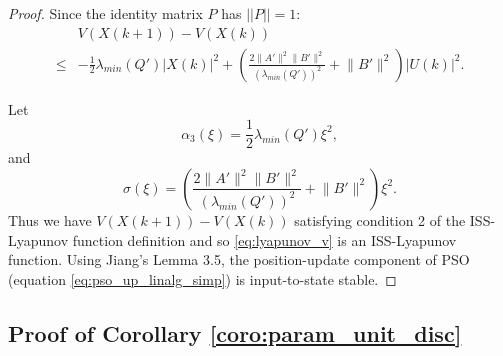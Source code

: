 \documentclass{sig-alternate}
\begin{document}
\begin{proof}
Since the identity matrix $ P $ has $ || P || = 1 $:
\begin{equation}
\label{eq:lyapunov_delta5}
\begin{aligned}
& V( X(k+1) ) - V( X(k) ) \\
	\leq & - \frac{1}{2} \lambda_{min}(Q') | X(k) |^{2} + \left( \frac{2 \lVert A' \rVert^{2} \lVert B' \rVert^{2}}{ ( \lambda_{min}(Q') )^{2} } + \lVert B' \rVert^{2} \right) | U(k) |^{2}.
\end{aligned}
\end{equation}
		
Let
\begin{equation}
\nonumber
\alpha_{3} ( \xi )= \frac{1}{2} \lambda_{min}(Q') \xi^{2} ,
\end{equation}
and
\begin{equation}
\nonumber
\sigma ( \xi ) = \left( \frac{2 \lVert A' \rVert^{2} \lVert B' \rVert^{2}}{ ( \lambda_{min}(Q') )^{2} } +  \lVert B' \rVert^{2} \right) \xi^{2} .
\end{equation} 
Thus we have $  V( X(k+1) ) - V( X(k) ) $ satisfying condition 2 of the ISS-Lyapunov function definition and
so \eqref{eq:lyapunov_v} is an ISS-Lyapunov function.
Using Jiang's Lemma 3.5\cite{Jiang2001857}, the position-update component of PSO (equation \eqref{eq:pso_up_linalg_simp}) is input-to-state stable.
\end{proof}

\subsection{Proof of Corollary \ref{coro:param_unit_disc}}
\label{sec:coro:param_unit_disc:proof}
\end{document}
